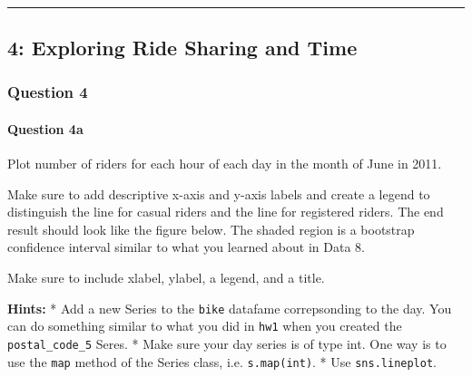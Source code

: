 \documentclass[11pt]{article}
\begin{document}
    \begin{center}
    \end{center}
    { \hspace*{\fill} \\}
    
    \begin{center}\rule{0.5\linewidth}{\linethickness}\end{center}

\subsection{4: Exploring Ride Sharing and
Time}\label{exploring-ride-sharing-and-time}

\subsubsection{Question 4}\label{question-4}

\paragraph{Question 4a}\label{question-4a}

Plot number of riders for each hour of each day in the month of June in
2011.

Make sure to add descriptive x-axis and y-axis labels and create a
legend to distinguish the line for casual riders and the line for
registered riders. The end result should look like the figure below. The
shaded region is a bootstrap confidence interval similar to what you
learned about in Data 8.

Make sure to include xlabel, ylabel, a legend, and a title.

\textbf{Hints:} * Add a new Series to the \texttt{bike} datafame
correpsonding to the day. You can do something similar to what you did
in \texttt{hw1} when you created the \texttt{postal\_code\_5} Seres. *
Make sure your day series is of type int. One way is to use the
\texttt{map} method of the Series class, i.e. \texttt{s.map(int)}. * Use
\texttt{sns.lineplot}.
\end{document}
